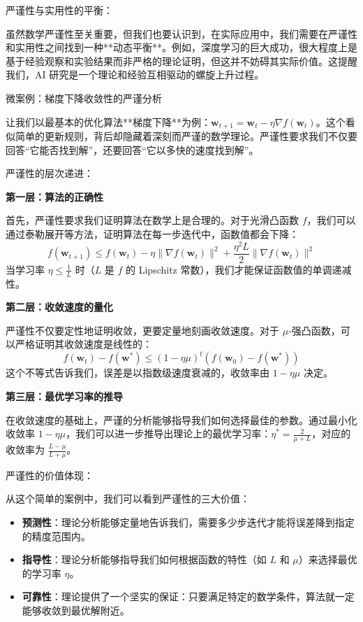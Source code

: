 严谨性与实用性的平衡：

虽然数学严谨性至关重要，但我们也要认识到，在实际应用中，我们需要在严谨性和实用性之间找到一种**动态平衡**。例如，深度学习的巨大成功，很大程度上是基于经验观察和实验结果而非严格的理论证明，但这并不妨碍其实际价值。这提醒我们，AI 研究是一个理论和经验互相驱动的螺旋上升过程。

微案例：梯度下降收敛性的严谨分析

让我们以最基本的优化算法**梯度下降**为例：$\mathbf{w}_{t+1} = \mathbf{w}_t - \eta \nabla f(\mathbf{w}_t)$。这个看似简单的更新规则，背后却隐藏着深刻而严谨的数学理论。严谨性要求我们不仅要回答“它能否找到解”，还要回答“它以多快的速度找到解”。

严谨性的层次递进：

\textbf{第一层：算法的正确性}

首先，严谨性要求我们证明算法在数学上是合理的。对于光滑凸函数 $f$，我们可以通过泰勒展开等方法，证明算法在每一步迭代中，函数值都会下降：
$$f(\mathbf{w}_{t+1}) \leq f(\mathbf{w}_t) - \eta \|\nabla f(\mathbf{w}_t)\|^2 + \frac{\eta^2 L}{2} \|\nabla f(\mathbf{w}_t)\|^2$$
当学习率 $\eta \leq \frac{1}{L}$ 时（$L$ 是 $f$ 的 Lipschitz 常数），我们才能保证函数值的单调递减性。

\textbf{第二层：收敛速度的量化}

严谨性不仅要定性地证明收敛，更要定量地刻画收敛速度。对于 $\mu$-强凸函数，可以严格证明其收敛速度是线性的：
$$f(\mathbf{w}_t) - f(\mathbf{w}^*) \leq \left(1 - \eta\mu\right)^t (f(\mathbf{w}_0) - f(\mathbf{w}^*))$$
这个不等式告诉我们，误差是以指数级速度衰减的，收敛率由 $1-\eta\mu$ 决定。

\textbf{第三层：最优学习率的推导}

在收敛速度的基础上，严谨的分析能够指导我们如何选择最佳的参数。通过最小化收敛率 $1-\eta\mu$，我们可以进一步推导出理论上的最优学习率：$\eta^* = \frac{2}{\mu + L}$，对应的收敛率为 $\frac{L-\mu}{L+\mu}$。

严谨性的价值体现：

从这个简单的案例中，我们可以看到严谨性的三大价值：

\begin{itemize}
\item \textbf{预测性}：理论分析能够定量地告诉我们，需要多少步迭代才能将误差降到指定的精度范围内。
\item \textbf{指导性}：理论分析能够指导我们如何根据函数的特性（如 $L$ 和 $\mu$）来选择最优的学习率 $\eta$。
\item \textbf{可靠性}：理论提供了一个坚实的保证：只要满足特定的数学条件，算法就一定能够收敛到最优解附近。
\end{itemize}

